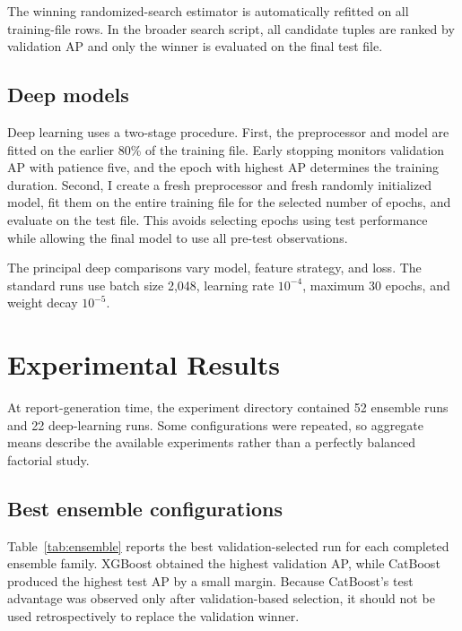 \documentclass[11pt,a4paper]{article}
\begin{document}
The winning randomized-search estimator is automatically refitted on all training-file rows. In the broader search script, all candidate tuples are ranked by validation AP and only the winner is evaluated on the final test file.

\subsection{Deep models}

Deep learning uses a two-stage procedure. First, the preprocessor and model are fitted on the earlier 80\% of the training file. Early stopping monitors validation AP with patience five, and the epoch with highest AP determines the training duration. Second, I create a fresh preprocessor and fresh randomly initialized model, fit them on the entire training file for the selected number of epochs, and evaluate on the test file. This avoids selecting epochs using test performance while allowing the final model to use all pre-test observations.

The principal deep comparisons vary model, feature strategy, and loss. The standard runs use batch size 2,048, learning rate $10^{-4}$, maximum 30 epochs, and weight decay $10^{-5}$.

\section{Experimental Results}

At report-generation time, the experiment directory contained 52 ensemble runs and 22 deep-learning runs. Some configurations were repeated, so aggregate means describe the available experiments rather than a perfectly balanced factorial study.

\subsection{Best ensemble configurations}

Table~\ref{tab:ensemble} reports the best validation-selected run for each completed ensemble family. XGBoost obtained the highest validation AP, while CatBoost produced the highest test AP by a small margin. Because CatBoost's test advantage was observed only after validation-based selection, it should not be used retrospectively to replace the validation winner.
\end{document}
